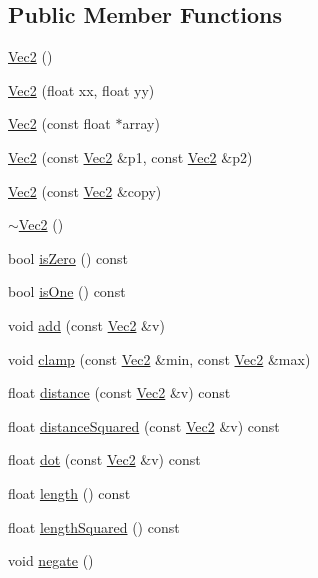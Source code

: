 \subsection*{Public Member Functions}
\begin{DoxyCompactItemize}
\item 
\hyperlink{classVec2_a7d3b326498b7ecc18020731109cb4bb8}{Vec2} ()
\item 
\hyperlink{classVec2_a8e4727da05d8400e3c7153b76974214c}{Vec2} (float xx, float yy)
\item 
\hyperlink{classVec2_a469928d68a31daa0f3cd858e8b68701d}{Vec2} (const float $\ast$array)
\item 
\hyperlink{classVec2_aff34a0a8b960dcfbcc5ac1d8d3af3493}{Vec2} (const \hyperlink{classVec2}{Vec2} \&p1, const \hyperlink{classVec2}{Vec2} \&p2)
\item 
\hyperlink{classVec2_a89f30fddf7a90a5bcd36a6a1064bc81f}{Vec2} (const \hyperlink{classVec2}{Vec2} \&copy)
\item 
\hyperlink{classVec2_a13007f52587b4205f78ed6b1659f5eac}{$\sim$\+Vec2} ()
\item 
bool \hyperlink{classVec2_ad399155b1760c192c1afafdb5d7ccea3}{is\+Zero} () const
\item 
bool \hyperlink{classVec2_a3fad8b882142f8e96c4b50a2a8c5d1a6}{is\+One} () const
\item 
void \hyperlink{classVec2_a83705106dc5f7903512f26c09c317a21}{add} (const \hyperlink{classVec2}{Vec2} \&v)
\item 
void \hyperlink{classVec2_a5c3444068aab183f97eb5081b817748a}{clamp} (const \hyperlink{classVec2}{Vec2} \&min, const \hyperlink{classVec2}{Vec2} \&max)
\item 
float \hyperlink{classVec2_a95cf4ec6593042a5c19186828f53d146}{distance} (const \hyperlink{classVec2}{Vec2} \&v) const
\item 
float \hyperlink{classVec2_a5bf11958886ffb9d406a7d4e7eae4237}{distance\+Squared} (const \hyperlink{classVec2}{Vec2} \&v) const
\item 
float \hyperlink{classVec2_a0077f35f41e7499847b5332a0ce42438}{dot} (const \hyperlink{classVec2}{Vec2} \&v) const
\item 
float \hyperlink{classVec2_af9ebf7c8888fd5df9514e6d519b99fb2}{length} () const
\item 
float \hyperlink{classVec2_a5dbc5e767907b2e217060479c52777bb}{length\+Squared} () const
\item 
void \hyperlink{classVec2_a26074525e995a2085bd63d9a146f2e33}{negate} ()
\item 

\end{DoxyCompactItemize}
